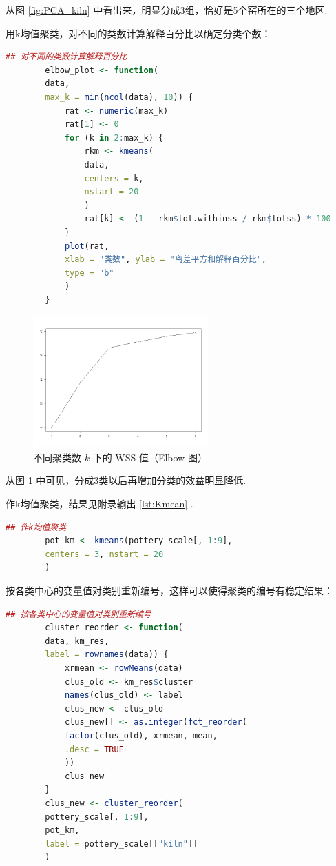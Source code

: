 \documentclass[12pt, a4paper, oneside]{ctexart}
\begin{document}
	从图 \ref{fig:PCA_kiln} 中看出来，明显分成3组，恰好是5个窑所在的三个地区.
	
	用k均值聚类，对不同的类数计算解释百分比以确定分类个数：
	\begin{lstlisting}[language=R]
		## 对不同的类数计算解释百分比
		elbow_plot <- function(
		data,
		max_k = min(ncol(data), 10)) {
			rat <- numeric(max_k)
			rat[1] <- 0
			for (k in 2:max_k) {
				rkm <- kmeans(
				data,
				centers = k,
				nstart = 20
				)
				rat[k] <- (1 - rkm$tot.withinss / rkm$totss) * 100
			}
			plot(rat,
			xlab = "类数", ylab = "离差平方和解释百分比",
			type = "b"
			)
		}
	\end{lstlisting}
	\begin{figure}[H]
		\centering
		\includegraphics[width=0.6\textwidth]{../Figure/elbow_plot.png}
		\caption{不同聚类数 $k$ 下的 WSS 值（Elbow 图）}
		\label{fig:elbow}
	\end{figure}
	
	从图 \ref{fig:elbow} 中可见，分成3类以后再增加分类的效益明显降低.
	
	作k均值聚类，结果见附录输出 \ref{lst:Kmean} .
	\begin{lstlisting}[language=R]
		## 作k均值聚类
		pot_km <- kmeans(pottery_scale[, 1:9],
		centers = 3, nstart = 20
		)
	\end{lstlisting}
	
	按各类中心的变量值对类别重新编号，这样可以使得聚类的编号有稳定结果：
	\begin{lstlisting}[language=R]
		## 按各类中心的变量值对类别重新编号
		cluster_reorder <- function(
		data, km_res,
		label = rownames(data)) {
			xrmean <- rowMeans(data)
			clus_old <- km_res$cluster
			names(clus_old) <- label
			clus_new <- clus_old
			clus_new[] <- as.integer(fct_reorder(
			factor(clus_old), xrmean, mean,
			.desc = TRUE
			))
			clus_new
		}
		clus_new <- cluster_reorder(
		pottery_scale[, 1:9],
		pot_km,
		label = pottery_scale[["kiln"]]
		)
	\end{lstlisting}
	
\end{document}
